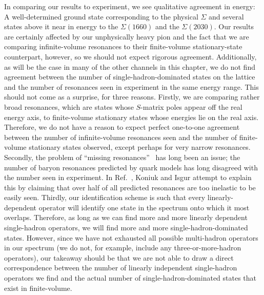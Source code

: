 In comparing our results to experiment, we see qualitative agreement in energy: A well-determined ground state corresponding to the physical $\Sigma$ and several states above it near in energy to the $\Sigma(1660)$ and the $\Sigma(2030)$. Our results are certainly affected by our unphysically heavy pion and the fact that we are comparing infinite-volume resonances to their finite-volume stationary-state counterpart, however, so we should not expect rigorous agreement. Additionally, as will be the case in many of the other channels in this chapter, we do not find agreement between the number of single-hadron-dominated states on the lattice and the number of resonances seen in experiment in the same energy range. This should not come as a surprise, for three reasons. Firstly, we are comparing rather broad resonances, which are states whose $S$-matrix poles appear off the real energy axis, to finite-volume stationary states whose energies lie on the real axis. Therefore, we do not have a reason to expect perfect one-to-one agreement between the number of infinite-volume resonances seen and the number of finite-volume stationary states observed, except perhaps for very narrow resonances. Secondly, the problem of ``missing resonances''~\cite{Koniuk:1979vw} has long been an issue; the number of baryon resonances predicted by quark models has long disagreed with the number seen in experiment. In Ref.~\cite{Koniuk:1979vw}, Koniuk and Isgur attempt to explain this by claiming that over half of all predicted resonances are too inelastic to be easily seen. Thirdly, our identification scheme is such that every linearly-dependent operator will identify one state in the spectrum onto which it most overlaps. Therefore, as long as we can find more and more linearly dependent single-hadron operators, we will find more and more single-hadron-dominated states. However, since we have not exhausted all possible multi-hadron operators in our spectrum (we do not, for example, include any three-or-more-hadron operators), our takeaway should be that we are not able to draw a direct correspondence between the number of linearly independent single-hadron operators we find and the actual number of single-hadron-dominated states that exist in finite-volume.

